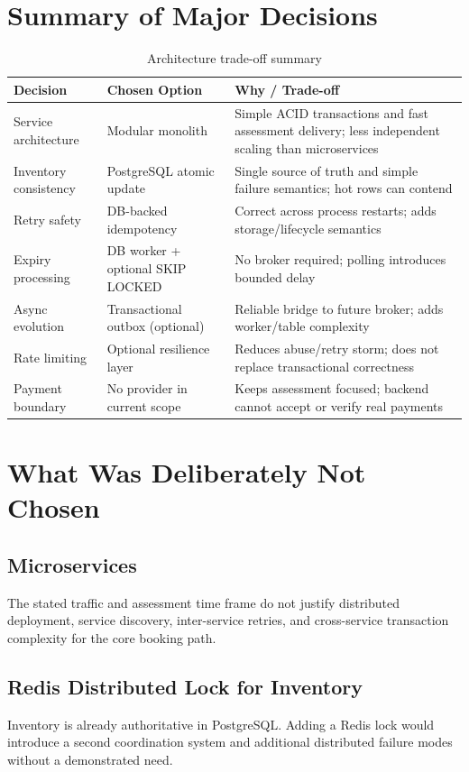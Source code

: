 \section{Summary of Major Decisions}
\begin{table}[H]
\centering
\caption{Architecture trade-off summary}
\begin{tabularx}{\textwidth}{p{}p{}Y}
\toprule
\textbf{Decision} & \textbf{Chosen Option} & \textbf{Why / Trade-off} \\
\midrule
Service architecture & Modular monolith & Simple ACID transactions and fast assessment delivery; less independent scaling than microservices \\
Inventory consistency & PostgreSQL atomic update & Single source of truth and simple failure semantics; hot rows can contend \\
Retry safety & DB-backed idempotency & Correct across process restarts; adds storage/lifecycle semantics \\
Expiry processing & DB worker + optional SKIP LOCKED & No broker required; polling introduces bounded delay \\
Async evolution & Transactional outbox (optional) & Reliable bridge to future broker; adds worker/table complexity \\
Rate limiting & Optional resilience layer & Reduces abuse/retry storm; does not replace transactional correctness \\
Payment boundary & No provider in current scope & Keeps assessment focused; backend cannot accept or verify real payments \\
\bottomrule
\end{tabularx}
\end{table}

\section{What Was Deliberately Not Chosen}
\subsection{Microservices}
The stated traffic and assessment time frame do not justify distributed deployment, service discovery, inter-service retries, and cross-service transaction complexity for the core booking path.

\subsection{Redis Distributed Lock for Inventory}
Inventory is already authoritative in PostgreSQL. Adding a Redis lock would introduce a second coordination system and additional distributed failure modes without a demonstrated need.


